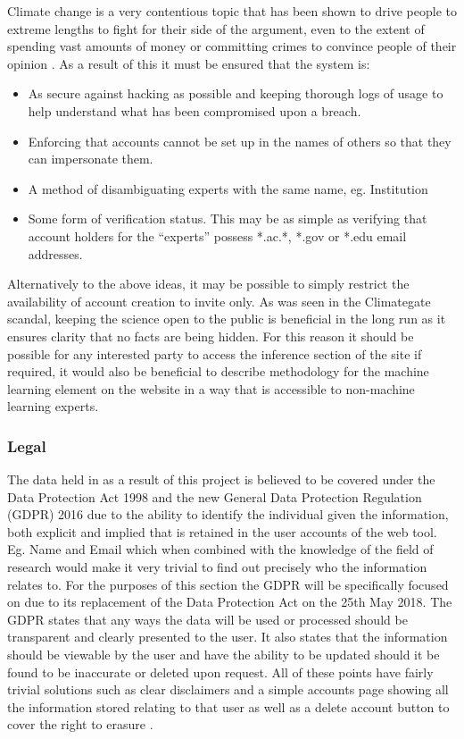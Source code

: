 \documentclass{ecmm427_assignment}
\begin{document}
Climate change is a very contentious topic that has been shown to
drive people to extreme lengths to fight for their side of the argument,
even to the extent of spending vast amounts of money or committing
crimes to convince people of their opinion \cite{nerlich2010climategate}. As a result
of this it must be ensured that the system is:
\begin{itemize}
\item As secure against hacking as possible and keeping thorough logs of
usage to help understand what has been compromised upon a breach.
\item Enforcing that accounts cannot be set up in the names of others so
that they can impersonate them. 
\item A method of disambiguating experts with the same name, eg. Institution
\item Some form of verification status. This may be as simple as verifying
that account holders for the ``experts'' possess {*}.ac.{*}, {*}.gov
or {*}.edu email addresses. 
\end{itemize}
Alternatively to the above ideas, it may be possible to simply restrict
the availability of account creation to invite only. As was seen in
the Climategate scandal, keeping the science open to the public is
beneficial in the long run as it ensures clarity that no facts are
being hidden. For this reason it should be possible for any interested
party to access the inference section of the site if required, it
would also be beneficial to describe methodology for the machine learning
element on the website in a way that is accessible to non-machine
learning experts.

\subsubsection{Legal }

The data held in as a result of this project is believed to be covered
under the Data Protection Act 1998 and the new General Data Protection
Regulation (GDPR) 2016 due to the ability to identify the individual
given the information, both explicit and implied that is retained in
the user accounts of the web tool. Eg. Name and Email which when combined
with the knowledge of the field of research would make it very trivial
to find out precisely who the information relates to. For the purposes
of this section the GDPR will be specifically focused on due to its
replacement of the Data Protection Act on the 25th May 2018. The GDPR
states that any ways the data will be used or processed should be
transparent and clearly presented to the user. It also states that
the information should be viewable by the user and have the ability
to be updated should it be found to be inaccurate or deleted upon
request. All of these points have fairly trivial solutions such as
clear disclaimers and a simple accounts page showing all the information
stored relating to that user as well as a delete account button to
cover the right to erasure \cite{eu:gdpr}. 
\end{document}
